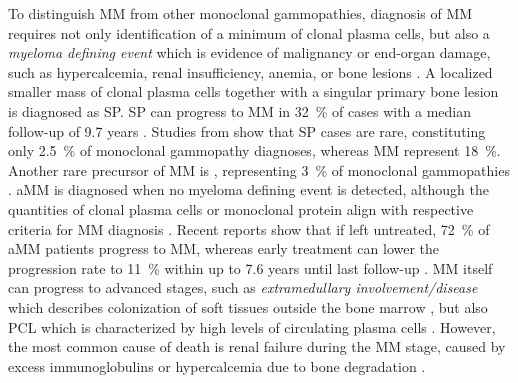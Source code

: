 To distinguish \ac{MM} from other monoclonal gammopathies, diagnosis of \ac{MM}
requires not only identification of a minimum of clonal plasma cells, but also a
\emph{myeloma defining event} which is evidence of malignancy or end-organ
damage, such as hypercalcemia, renal insufficiency, anemia, or bone lesions
\cite{rajkumarInternationalMyelomaWorking2014}. A localized
smaller mass of clonal plasma
cells together with a singular primary bone lesion is diagnosed as \ac{SP}.
\ac{SP} can progress to \ac{MM} in \SI{32}{\percent} of cases with a median
follow-up of 9.7 years
\cite{thumallapallySolitaryPlasmacytomaPopulationbased2017,
    gaoSolitaryBonePlasmacytoma2024}. Studies from
\citet{kyleMonoclonalGammopathyUndetermined1997} show that \ac{SP} cases are
rare, constituting only \SI{2.5}{\percent} of monoclonal gammopathy diagnoses,
whereas \ac{MM} represent \SI{18}{\percent}. Another rare precursor of \ac{MM}
is  , representing \SI{3}{\percent} of
monoclonal gammopathies \cite{kyleMonoclonalGammopathyUndetermined1997}.
\ac{aMM} is diagnosed when no myeloma defining event is detected, although the
quantities of clonal plasma cells or monoclonal protein align with respective
criteria for \ac{MM} diagnosis \cite{rajkumarInternationalMyelomaWorking2014}.
Recent reports show that if left untreated, \SI{72}{\percent} of \ac{aMM}
patients progress to \ac{MM}, whereas early treatment can lower the progression
rate to \SI{11}{\percent} within up to 7.6 years until last
follow-up
\cite{abdallahModeProgressionSmoldering2024,
    mateosmaria-victoriaLenalidomideDexamethasoneHighRisk2013}. \ac{MM} itself can
progress to advanced stages, such as \emph{extramedullary involvement/disease}
which describes colonization of soft tissues outside the bone marrow
\cite{bladeExtramedullaryDiseaseMultiple2022}, but also \ac{PCL} which is
characterized by high levels of circulating plasma cells
\cite{jungUpdatePrimaryPlasma2022}. However, the most common cause of death is
renal failure during the \ac{MM} stage, caused by excess immunoglobulins or
hypercalcemia due to bone degradation \cite{kunduMultipleMyelomaRenal2022}.

